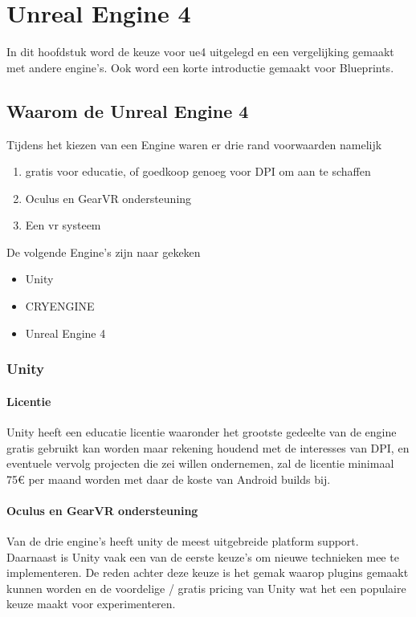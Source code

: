 \chapter{Unreal Engine 4}

In dit hoofdstuk word de keuze voor \gls{ue4} uitgelegd en een vergelijking gemaakt met andere engine's.
Ook word een korte introductie gemaakt voor Blueprints.

\section{Waarom de Unreal Engine 4}

Tijdens het kiezen van een Engine waren er drie rand voorwaarden namelijk 
\begin{enumerate}
	\item gratis voor educatie, of goedkoop genoeg voor DPI om aan te schaffen
	\item Oculus en GearVR ondersteuning
	\item Een \gls{vr} systeem
\end{enumerate}

De volgende Engine’s zijn naar gekeken 
\begin{itemize}
\item Unity
\item CRYENGINE
\item Unreal Engine 4
\end{itemize}

\subsection{Unity}

\subsubsection{Licentie}
Unity heeft een educatie licentie waaronder het grootste gedeelte van de engine gratis gebruikt kan worden maar rekening houdend met de interesses van DPI, en eventuele vervolg projecten die zei willen ondernemen, zal de licentie minimaal 75€ per maand worden met daar de koste van Android builds bij.

\subsubsection{Oculus en GearVR ondersteuning}
Van de drie engine’s heeft unity de meest uitgebreide platform support. Daarnaast is Unity vaak een van de eerste keuze’s om nieuwe technieken mee te implementeren. De reden achter deze keuze is het gemak waarop plugins gemaakt kunnen worden en de voordelige / gratis pricing van Unity wat het een populaire keuze maakt voor experimenteren.

